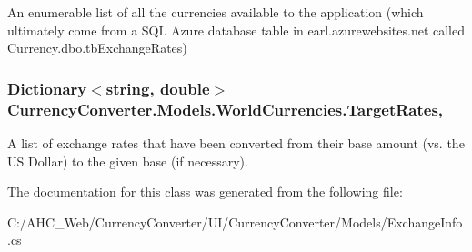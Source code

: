 An enumerable list of all the currencies available to the application (which ultimately come from a S\-Q\-L Azure database table in earl.\-azurewebsites.\-net called Currency.\-dbo.\-tb\-Exchange\-Rates) 

\hypertarget{class_currency_converter_1_1_models_1_1_world_currencies_ac31be6d2926cc18ee8eb3265ab1de0db}{
\subsubsection[{Target\-Rates}]{\setlength{\rightskip}{0pt plus 5cm}Dictionary$<$string, double$>$ Currency\-Converter.\-Models.\-World\-Currencies.\-Target\-Rates\hspace{0.3cm}{\ttfamily [get]}, {\ttfamily [set]}}}\label{class_currency_converter_1_1_models_1_1_world_currencies_ac31be6d2926cc18ee8eb3265ab1de0db}


A list of exchange rates that have been converted from their base amount (vs. the U\-S Dollar) to the given base (if necessary). 



The documentation for this class was generated from the following file\-:\begin{DoxyCompactItemize}
\item 
C\-:/\-A\-H\-C\-\_\-\-Web/\-Currency\-Converter/\-U\-I/\-Currency\-Converter/\-Models/Exchange\-Info.\-cs\end{DoxyCompactItemize}

